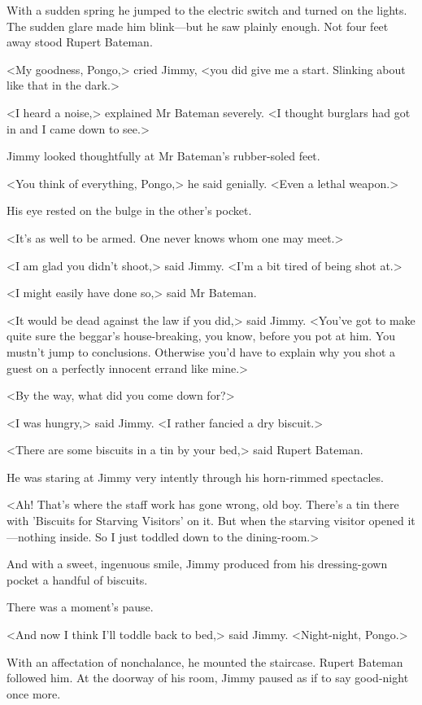 With a sudden spring he jumped to the electric switch and turned on the lights. The sudden glare made him blink—but he saw plainly enough. Not four feet away stood Rupert Bateman.

<My goodness, Pongo,> cried Jimmy, <you did give me a start. Slinking about like that in the dark.>

<I heard a noise,> explained Mr Bateman severely. <I thought burglars had got in and I came down to see.>

Jimmy looked thoughtfully at Mr Bateman's rubber-soled feet.

<You think of everything, Pongo,> he said genially. <Even a lethal weapon.>

His eye rested on the bulge in the other's pocket.

<It's as well to be armed. One never knows whom one may meet.>

<I am glad you didn't shoot,> said Jimmy. <I'm a bit tired of being shot at.>

<I might easily have done so,> said Mr Bateman.

<It would be dead against the law if you did,> said Jimmy. <You've got to make quite sure the beggar's house-breaking, you know, before you pot at him. You mustn't jump to conclusions. Otherwise you'd have to explain why you shot a guest on a perfectly innocent errand like mine.>

<By the way, what did you come down for?>

<I was hungry,> said Jimmy. <I rather fancied a dry biscuit.>

<There are some biscuits in a tin by your bed,> said Rupert Bateman.

He was staring at Jimmy very intently through his horn-rimmed spectacles.

<Ah! That's where the staff work has gone wrong, old boy. There's a tin there with 'Biscuits for Starving Visitors' on it. But when the starving visitor opened it—nothing inside. So I just toddled down to the dining-room.>

And with a sweet, ingenuous smile, Jimmy produced from his dressing-gown pocket a handful of biscuits.

There was a moment's pause.

<And now I think I'll toddle back to bed,> said Jimmy. <Night-night, Pongo.>

With an affectation of nonchalance, he mounted the staircase. Rupert Bateman followed him. At the doorway of his room, Jimmy paused as if to say good-night once more.

